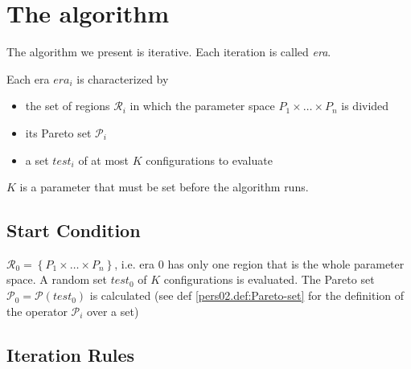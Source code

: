 
\section{The algorithm}

The algorithm we present is iterative. Each iteration is called \emph{era}. 

Each era $era_{i}$ is characterized by 
\begin{itemize}
\item the set of regions $\mathcal{R}_{i}$ in which the parameter space
$P_{1}\times\dots\times P_{n}$ is divided
\item its Pareto set $\mathscr{P}_{i}$
\item a set $test_{i}$ of at most $K$ configurations to evaluate
\end{itemize}
$K$ is a parameter that must be set before the algorithm runs.


\subsection{Start Condition}
$\mathcal{R}_{0}=\left\{ P_{1}\times\dots\times P_{n}\right\} $,
i.e. era $0$ has only one region that is the whole parameter space.
A random set $test_{0}$ of $K$ configurations is evaluated. The
Pareto set $\mathscr{P}_{0}=\mathscr{P}\left(test_{0}\right)$ is
calculated (see def \ref{pers02.def:Pareto-set} for the definition
of the operator $\mathscr{P}_{i}$ over a set)

\subsection{Iteration Rules}

